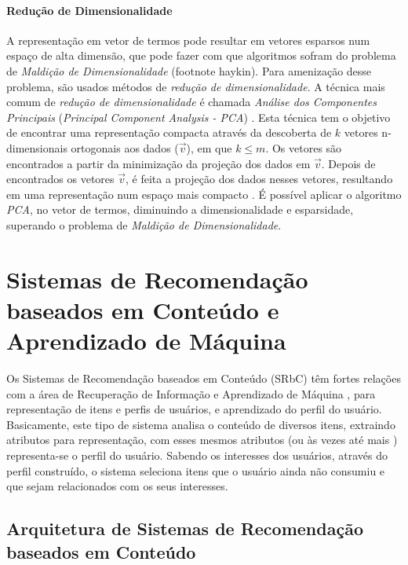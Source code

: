 \documentclass[normaltoc, espacoumemeio, pnumromarab,ruledheader]{abnt}
\begin{document}
\subsubsection{Redução de Dimensionalidade}

A representação em vetor de termos pode resultar em vetores esparsos num espaço de alta dimensão, que pode fazer com que algoritmos sofram do problema de \textit{Maldição de Dimensionalidade} (footnote haykin).
Para amenização desse problema, são usados métodos de \textit{redução de dimensionalidade}.
A técnica mais comum de \textit{redução de dimensionalidade} é chamada \textit{Análise dos Componentes Principais} (\textit{Principal Component Analysis - PCA}) \cite{Murphy2012}.
Esta técnica tem o objetivo de encontrar uma representação compacta através da descoberta de $k$ vetores n-dimensionais ortogonais aos dados ($\vec{v}$), em que $k \leq m$. Os vetores são encontrados a partir da minimização da projeção dos dados em $\vec{v}$.
Depois de encontrados os vetores $\vec{v}$, é feita a projeção dos dados nesses vetores, resultando em uma representação num espaço mais compacto \cite{Kamber2011}.
É possível aplicar o algoritmo \textit{PCA}, no vetor de termos, diminuindo a dimensionalidade e esparsidade, superando o problema de \textit{Maldição de Dimensionalidade}.


\chapter{Sistemas de Recomendação baseados em Conteúdo e Aprendizado de Máquina}


Os Sistemas de Recomendação baseados em Conteúdo (SRbC) têm fortes relações com a área de Recuperação de Informação \cite{Adomavicius2005,Jannach2011} e Aprendizado de Máquina \cite{Adomavicius2005,Lops2011}, para representação de itens e perfis de usuários, e aprendizado do perfil do usuário.
Basicamente, este tipo de sistema analisa o conteúdo de diversos itens, extraindo atributos para representação, com esses mesmos atributos (ou às vezes até mais \cite{Capelle2012}) representa-se o perfil do usuário.
Sabendo os interesses dos usuários, através do perfil construído, o sistema seleciona itens que o usuário ainda não consumiu e que sejam relacionados com os seus interesses.

\section{Arquitetura de Sistemas de Recomendação baseados em Conteúdo}
\label{sec:arquitetura}
\end{document}
